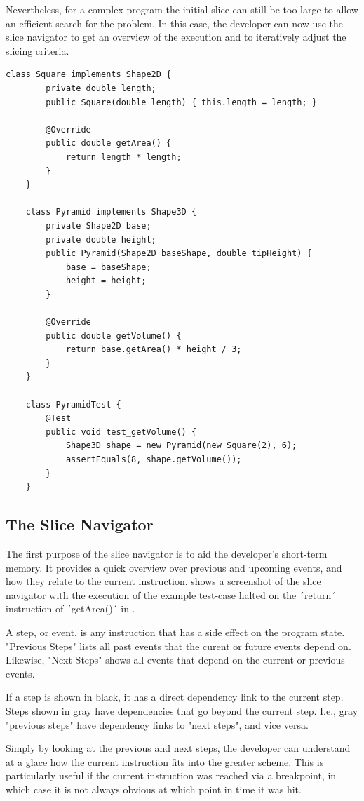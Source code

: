 ﻿\documentclass[
      english,
			conference,
      ]{IEEEtran}
\begin{document}
Nevertheless, for a complex program the initial slice can still be too large to allow an efficient search for the problem.
In this case, the developer can now use the slice navigator to get an overview of the execution and to iteratively adjust the slicing criteria.

\begin{lstlisting}[float=t,label=lst:example,caption={Example program with a failing test case}]
	class Square implements Shape2D {
		private double length;
		public Square(double length) { this.length = length; }
		
		@Override
		public double getArea() { 
			return length * length;
		}
	}
	
	class Pyramid implements Shape3D {
		private Shape2D base;
		private double height;
		public Pyramid(Shape2D baseShape, double tipHeight) {
			base = baseShape;
			height = height;
		}
		
		@Override
		public double getVolume() { 
			return base.getArea() * height / 3; 
		}
	}
	
	class PyramidTest {
		@Test
		public void test_getVolume() {
			Shape3D shape = new Pyramid(new Square(2), 6);
			assertEquals(8, shape.getVolume());
		}
	}
\end{lstlisting}

\subsection{The Slice Navigator}

The first purpose of the slice navigator is to aid the developer's short-term memory.
It provides a quick overview over previous and upcoming events, and how they relate to the current instruction.
 shows a screenshot of the slice navigator with the execution of the example test-case halted on the ´return´ instruction of ´getArea()´ in .

A step, or event, is any instruction that has a side effect on the program state.
"Previous Steps" lists all past events that the curent or future events depend on.
Likewise, "Next Steps" shows all events that depend on the current or previous events.

If a step is shown in black, it has a direct dependency link to the current step.
Steps shown in gray have dependencies that go beyond the current step.
I.e., gray "previous steps" have dependency links to "next steps", and vice versa.

Simply by looking at the previous and next steps, the developer can understand at a glace how the current instruction fits into the greater scheme.
This is particularly useful if the current instruction was reached via a breakpoint, in which case it is not always obvious at which point in time it was hit.
\end{document}
